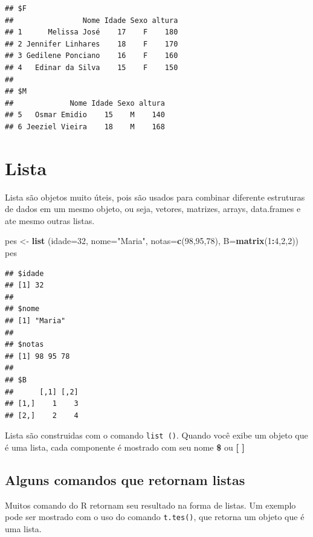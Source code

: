 \documentclass[]{book}
\newenvironment{Shaded}{\begin{snugshade}}{\end{snugshade}}
\newcommand{\DataTypeTok}[1]{\textcolor[rgb]{0.13,0.29,0.53}{#1}}
\newcommand{\DecValTok}[1]{\textcolor[rgb]{0.00,0.00,0.81}{#1}}
\newcommand{\KeywordTok}[1]{\textcolor[rgb]{0.13,0.29,0.53}{\textbf{#1}}}
\newcommand{\NormalTok}[1]{#1}
\newcommand{\OperatorTok}[1]{\textcolor[rgb]{0.81,0.36,0.00}{\textbf{#1}}}
\newcommand{\StringTok}[1]{\textcolor[rgb]{0.31,0.60,0.02}{#1}}
\begin{document}
\begin{verbatim}
## $F
##                Nome Idade Sexo altura
## 1      Melissa José    17    F    180
## 2 Jennifer Linhares    18    F    170
## 3 Gedilene Ponciano    16    F    160
## 4   Edinar da Silva    15    F    150
## 
## $M
##             Nome Idade Sexo altura
## 5   Osmar Emidio    15    M    140
## 6 Jeeziel Vieira    18    M    168
\end{verbatim}

\hypertarget{lista}{%
\section{Lista}\label{lista}}

Lista são objetos muito úteis, pois são usados para combinar diferente estruturas de dados em um mesmo objeto, ou seja, vetores, matrizes, arrays, data.frames e ate mesmo outras listas.

\begin{Shaded}
\begin{Highlighting}[]
\NormalTok{pes <-}\StringTok{ }\KeywordTok{list}\NormalTok{ (}\DataTypeTok{idade=}\DecValTok{32}\NormalTok{, }\DataTypeTok{nome=}\StringTok{"Maria"}\NormalTok{, }\DataTypeTok{notas=}\KeywordTok{c}\NormalTok{(}\DecValTok{98}\NormalTok{,}\DecValTok{95}\NormalTok{,}\DecValTok{78}\NormalTok{), }\DataTypeTok{B=}\KeywordTok{matrix}\NormalTok{(}\DecValTok{1}\OperatorTok{:}\DecValTok{4}\NormalTok{,}\DecValTok{2}\NormalTok{,}\DecValTok{2}\NormalTok{))}
\NormalTok{pes}
\end{Highlighting}
\end{Shaded}

\begin{verbatim}
## $idade
## [1] 32
## 
## $nome
## [1] "Maria"
## 
## $notas
## [1] 98 95 78
## 
## $B
##      [,1] [,2]
## [1,]    1    3
## [2,]    2    4
\end{verbatim}

Lista são construidas com o comando \texttt{list\ ()}. Quando você exibe um objeto que é uma lista, cada componente é mostrado com seu nome \textbf{\$} ou \textbf{{[} {]}}

\hypertarget{alguns-comandos-que-retornam-listas}{%
\subsection{Alguns comandos que retornam listas}\label{alguns-comandos-que-retornam-listas}}

Muitos comando do R retornam seu resultado na forma de listas. Um exemplo pode ser mostrado com o uso do comando \texttt{t.tes()}, que retorna um objeto que é uma lista.
\end{document}
